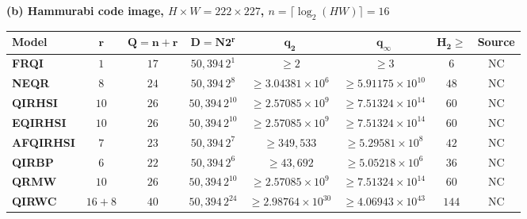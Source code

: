 \begin{table}
\par\vspace{0.3cm}
\textbf{(b) Hammurabi code image, $H\times W=222\times227$, $n=\lceil\log_2(HW)\rceil=16$}\\[3pt]
{\footnotesize\setlength{\tabcolsep}{4pt}
\begin{tabular}{lccccccc}
\hline\rowcolor{Bisque3}
\textbf{Model} & $\boldsymbol{r}$ & $\boldsymbol{Q=n+r}$ & $\boldsymbol{D=N2^r}$ & $\boldsymbol{q_2}$ & $\boldsymbol{q_\infty}$ & $\boldsymbol{H_2\geq}$ & \textbf{Source}\\
\hline
\textbf{FRQI} & \(1\) & \(17\) & \(50{,}394\,2^{1}\) & $\geq 2$ & $\geq 3$ & \(6\) & NC \\
\textbf{NEQR} & \(8\) & \(24\) & \(50{,}394\,2^{8}\) & $\geq 3.04381\times10^{6}$ & $\geq 5.91175\times10^{10}$ & \(48\) & NC \\
\textbf{QIRHSI} & \(10\) & \(26\) & \(50{,}394\,2^{10}\) & $\geq 2.57085\times10^{9}$ & $\geq 7.51324\times10^{14}$ & \(60\) & NC \\
\textbf{EQIRHSI} & \(10\) & \(26\) & \(50{,}394\,2^{10}\) & $\geq 2.57085\times10^{9}$ & $\geq 7.51324\times10^{14}$ & \(60\) & NC \\
\textbf{AFQIRHSI} & \(7\) & \(23\) & \(50{,}394\,2^{7}\) & $\geq 349{,}533$ & $\geq 5.29581\times10^{8}$ & \(42\) & NC \\
\textbf{QIRBP} & \(6\) & \(22\) & \(50{,}394\,2^{6}\) & $\geq 43{,}692$ & $\geq 5.05218\times10^{6}$ & \(36\) & NC \\
\textbf{QRMW} & \(10\) & \(26\) & \(50{,}394\,2^{10}\) & $\geq 2.57085\times10^{9}$ & $\geq 7.51324\times10^{14}$ & \(60\) & NC \\
\textbf{QIRWC} & \(16+8\) & \(40\) & \(50{,}394\,2^{24}\) & $\geq 2.98764\times10^{30}$ & $\geq 4.06943\times10^{43}$ & \(144\) & NC \\
\hline\end{tabular}}\par


\end{table}
